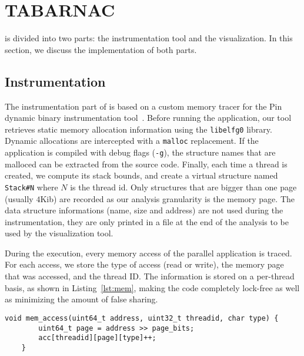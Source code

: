 
\section{TABARNAC}
\label{sec:design}

\TABARNAC is divided into two parts: the instrumentation tool and the
visualization. In this section, we discuss the implementation of both parts.

\subsection{Instrumentation}
\label{sec:design-impl}

The instrumentation part of \TABARNAC is based on a custom memory tracer for the Pin dynamic binary instrumentation tool~\cite{Luk05Pin}.
Before running the application, our tool retrieves static memory allocation
information using the \texttt{libelfg0} library. Dynamic allocations are
intercepted with a \texttt{malloc} replacement. If the application is
compiled with debug flags (\texttt{-g}), the structure names that are malloced can be extracted from the source
code. Finally, each time a thread is created, we compute
its stack bounds, and create a virtual structure named \texttt{Stack\#N} where
$N$ is the thread id. Only structures that are bigger than one page (usually
$4$Kib) are recorded as our
analysis granularity is the memory page. The data structure informations (name,
size and address) are not used during the instrumentation, they are only
printed in a file at the end of the analysis to be used by the visualization
tool.

During the execution, every memory access of the parallel application is traced.
For each access, we store the type of access (read or write), the memory page that was accessed, and the thread ID.
The information is stored on a per-thread basis, as shown in
Listing~\ref{lst:mem}, making the code completely lock-free as well as minimizing the amount of false sharing.

\begin{lstlisting}[caption={Code executed on each memory access. The \texttt{address}, \texttt{threadid} and \texttt{type} parameters are from Pin.},label=lst:mem]
	void mem_access(uint64_t address, uint32_t threadid, char type) {
		uint64_t page = address >> page_bits;
		acc[threadid][page][type]++;
	}

\end{lstlisting}


